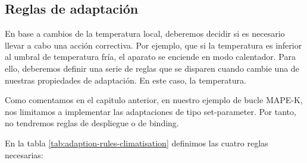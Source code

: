 \subsection{Reglas de adaptación}

En base a cambios de la temperatura local, deberemos decidir si es necesario llevar a cabo una acción correctiva. Por ejemplo, que si la temperatura es inferior al umbral de temperatura fría, el aparato se enciende en modo calentador. Para ello, deberemos definir una serie de reglas que se disparen cuando cambie una de nuestras propiedades de adaptación. En este caso, la temperatura.

Como comentamos en el capitulo anterior, en nuestro ejemplo de bucle MAPE-K, nos limitamos a implementar las adaptaciones de tipo set-parameter. Por tanto, no tendremos reglas de despliegue o de binding.

En la tabla \ref{tab:adaption-rules-climatisation} definimos las cuatro reglas necesarias:

